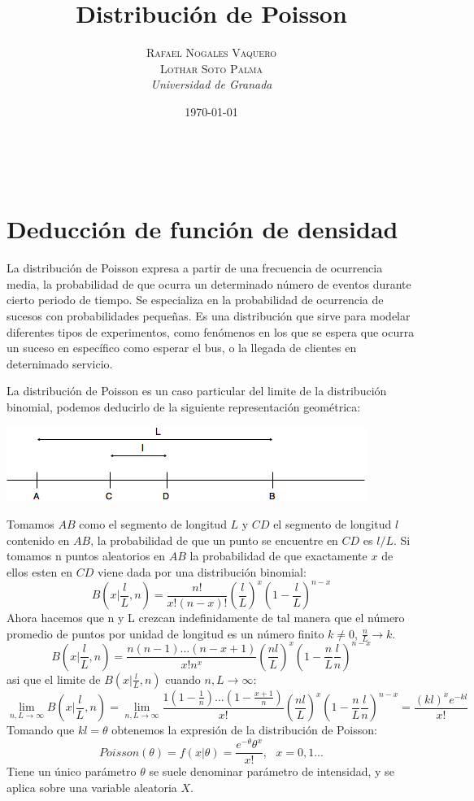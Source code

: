\documentclass[a4paper, 10pt]{article} %
\title{\textbf{Distribución de Poisson}\\ %
\vspace{20 pt}
} %
\author{\textsc{Rafael Nogales Vaquero\\
Lothar Soto Palma} %
\\{\textit{Universidad de Granada}}} %
\date{\today} %
\makeatletter
\renewcommand{\maketitle}{ %
\begin{center} %
{\Huge\@title} %
\end{center}

\vspace{20pt} %

\begin{flushright} %
{\large\@author} %
\\\@date %

\vspace{40pt} %
\end{flushright}
\renewcommand{\baselinestretch}{0.5}

}
\newcounter{def}
\makeatother
\begin{document}
\maketitle
\tableofcontents
\setcounter{page}{1}
\pagebreak
\section{Deducción de función de densidad}
La distribución de Poisson expresa a partir de una frecuencia de ocurrencia media, la probabilidad de que ocurra un determinado número de eventos durante cierto periodo de tiempo. Se especializa en la probabilidad de ocurrencia de sucesos con probabilidades pequeñas. Es una distribución que sirve para modelar diferentes tipos de experimentos, como fenómenos en los que se espera que ocurra un suceso en específico como esperar el bus, o la llegada de clientes en deternimado servicio.

La distribución de Poisson es un caso particular del limite de la distribución binomial, podemos deducirlo de la siguiente representación geométrica:\\
\begin{center}
\includegraphics[scale=0.6]{1.png} 
\end{center}
Tomamos $AB$ como el segmento de longitud $L$ y $CD$ el segmento de longitud $l$ contenido en $AB$, la probabilidad de que un punto se encuentre en $CD$ es $l/L$. Si tomamos n puntos aleatorios en $AB$ la probabilidad de que exactamente $x$ de ellos esten en $CD$ viene dada por una distribución binomial:
$$B(x|\frac{l}{L},n)=\frac{n!}{x!(n-x)!}(\frac{l}{L})^x(1-\frac{l}{L})^{n-x}$$
Ahora hacemos que n y L crezcan indefinidamente de tal manera que el número promedio de puntos por unidad de longitud es un número finito $k \neq 0$, $\frac{n}{L}\rightarrow k$.
$$B(x|\frac{l}{L},n)=\frac{n(n-1)...(n-x+1)}{x!n^x}(\frac{nl}{L})^x(1-\frac{n}{L}\frac{l}{n})^{n-x}$$
asi que el limite de $B(x|\frac{l}{L},n)$ cuando $n,L\rightarrow \infty$:
$$\lim_{n,L\rightarrow \infty}B(x|\frac{l}{L},n) = \lim_{n,L\rightarrow \infty}\frac{1(1-\frac{1}{n})...(1-\frac{x+1}{n})}{x!}(\frac{nl}{L})^x(1-\frac{n}{L}\frac{l}{n})^{n-x}=\frac{(kl)^xe^{-kl}}{x!}$$
Tomando que $kl=\theta$ obtenemos la expresión de la distribución de Poisson:
$$Poisson(\theta)=f(x|\theta)=\dfrac{e^{-\theta}\theta^x}{x!},\ \ \ x=0,1...$$
Tiene un único parámetro $\theta$ se suele denominar parámetro de intensidad, y se aplica sobre una variable aleatoria $X$.
\end{document}
